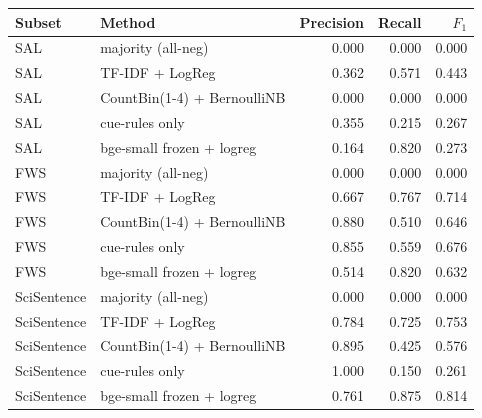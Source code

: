 \begin{tabular}{@{}llrrr@{}}
\toprule
Subset & Method & Precision & Recall & $F_1$ \\
\midrule
SAL & majority (all-neg) & 0.000 & 0.000 & 0.000 \\
SAL & TF-IDF + LogReg & 0.362 & 0.571 & 0.443 \\
SAL & CountBin(1-4) + BernoulliNB & 0.000 & 0.000 & 0.000 \\
SAL & cue-rules only & 0.355 & 0.215 & 0.267 \\
SAL & bge-small frozen + logreg & 0.164 & 0.820 & 0.273 \\
FWS & majority (all-neg) & 0.000 & 0.000 & 0.000 \\
FWS & TF-IDF + LogReg & 0.667 & 0.767 & 0.714 \\
FWS & CountBin(1-4) + BernoulliNB & 0.880 & 0.510 & 0.646 \\
FWS & cue-rules only & 0.855 & 0.559 & 0.676 \\
FWS & bge-small frozen + logreg & 0.514 & 0.820 & 0.632 \\
SciSentence & majority (all-neg) & 0.000 & 0.000 & 0.000 \\
SciSentence & TF-IDF + LogReg & 0.784 & 0.725 & 0.753 \\
SciSentence & CountBin(1-4) + BernoulliNB & 0.895 & 0.425 & 0.576 \\
SciSentence & cue-rules only & 1.000 & 0.150 & 0.261 \\
SciSentence & bge-small frozen + logreg & 0.761 & 0.875 & 0.814 \\
\bottomrule
\end{tabular}
